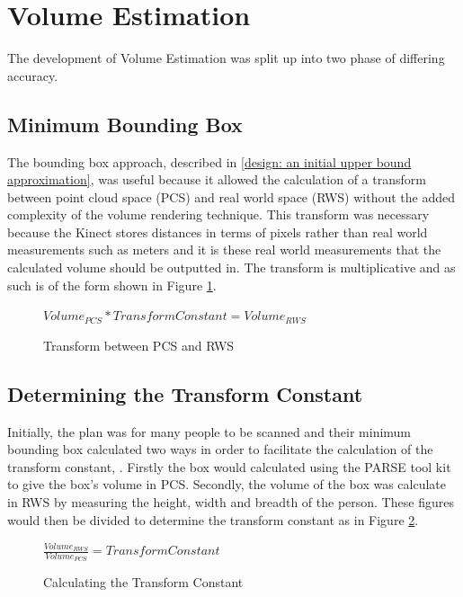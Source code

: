 \section{Volume Estimation}
\label{volume estimation}
The development of Volume Estimation was split up into two phase of differing accuracy.
\subsection{Minimum Bounding Box}
\label{testing: minimum bounding box}
The bounding box approach, described in \ref{design: an initial upper bound approximation}, was useful because it allowed the calculation of a transform between point cloud space (PCS) and real world space (RWS) without the added complexity of the volume rendering technique. This transform was necessary because the Kinect stores distances in terms of pixels rather than real world measurements such as meters and it is these real world measurements that the calculated volume should be outputted in. The transform is multiplicative and as such is of the form shown in Figure \ref{testing: transform between pcs and rws}.\\

\begin{figure}[h]
\begin{center}
$Volume_{PCS} * Transform Constant = Volume_{RWS}$
\end{center}
\caption{Transform between PCS and RWS}
\label{testing: transform between pcs and rws}
\end{figure}

\subsection{Determining the Transform Constant}
\label{determining the transform constant}
Initially, the plan was for many people to be scanned and their minimum bounding box calculated two ways in order to facilitate the calculation of the transform constant, . Firstly the box would calculated using the PARSE tool kit to give the box's volume in PCS. Secondly, the volume of the box was calculate in RWS by measuring the height, width and breadth of the person. These figures would then be divided to determine the transform constant as in Figure \ref{testing: calculating the transform constant}.

\begin{figure}[h]
\begin{center}
$\frac{Volume_{RWS}}{Volume_{PCS}} = Transform Constant$
\end{center}
\caption{Calculating the Transform Constant}
\label{testing: calculating the transform constant}
\end{figure}

